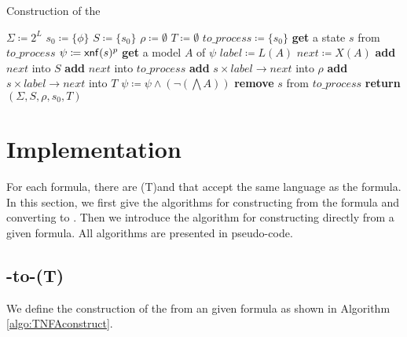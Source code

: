 \begin{algorithm}[H] \label{algo:TNFAconstruct}
  \caption{Construction of the \TNFA}
  \LinesNumbered
  $\Sigma\coloneqq 2^L$\;
  $s_0\coloneqq\{\phi\}$\;
  $S\coloneqq\{s_0\}$\;
  $\rho\coloneqq\emptyset$\;
  $T\coloneqq\emptyset$\;
  $to\_process\coloneqq\{s_0\}$\;
  {
    \textbf{get} a state $s$ from $to\_process$\;
    $\psi\coloneqq{\sf xnf}(s)^p$\;
    {
      \textbf{get} a model $A$ of $\psi$\;
      $label\coloneqq L(A)$\;
      $next\coloneqq X(A)$\;
      {
        \textbf{add} $next$ into $S$\;
        \textbf{add} $next$ into $to\_process$\;
      }
       \textbf{add} $s\times label\to next$ into $\rho$\;
      {
        \textbf{add} $s\times label\to next$ into $T$\;
      }
       $\psi\coloneqq \psi\land(\neg(\bigwedge A))$\;
    }
    \textbf{remove} $s$ from $to\_process$\;
  }
  \textbf{return} $(\Sigma,S,\rho,s_0,T)$\;
\end{algorithm}

\section{Implementation}\label{sec:algorithm}
For each \ltlf formula, there are (T)\NFA and \DFA that accept the same language as the formula. In this section, we first give the algorithms for constructing \TNFA from the \ltlf formula and converting \TNFA to \NFA. Then we introduce the algorithm for constructing \TDFA directly from a given \ltlf formula. All algorithms are presented in pseudo-code.

\subsection{\ltlf-to-(T)\NFA}
We define the construction of the \TNFA from an given \ltlf formula as shown in Algorithm \ref{algo:TNFAconstruct}. 


